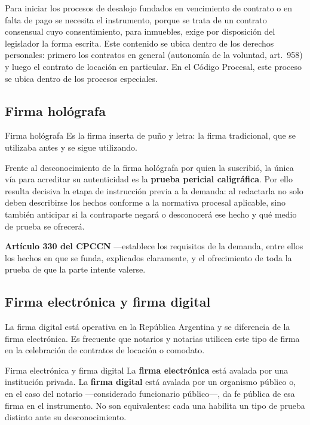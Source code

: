 \documentclass[12pt,oneside]{book}
\begin{document}
Para iniciar los procesos de desalojo fundados en vencimiento de contrato o en falta de pago se necesita el instrumento, porque se trata de un contrato consensual cuyo consentimiento, para inmuebles, exige por disposición del legislador la forma escrita. Este contenido se ubica dentro de los derechos personales: primero los contratos en general (autonomía de la voluntad, art.\ 958) y luego el contrato de locación en particular. En el Código Procesal, este proceso se ubica dentro de los procesos especiales.

\subsection{Firma hológrafa}

\begin{definition}{Firma hológrafa}
Es la firma inserta de puño y letra: la firma tradicional, que se utilizaba antes y se sigue utilizando.
\end{definition}

Frente al desconocimiento de la firma hológrafa por quien la suscribió, la única vía para acreditar su autenticidad es la \textbf{prueba pericial caligráfica}. Por ello resulta decisiva la etapa de instrucción previa a la demanda: al redactarla no solo deben describirse los hechos conforme a la normativa procesal aplicable, sino también anticipar si la contraparte negará o desconocerá ese hecho y qué medio de prueba se ofrecerá.

\begin{normacitada}
\textbf{Artículo 330 del CPCCN} ---establece los requisitos de la demanda, entre ellos los hechos en que se funda, explicados claramente, y el ofrecimiento de toda la prueba de que la parte intente valerse.
\end{normacitada}

\subsection{Firma electrónica y firma digital}

La firma digital está operativa en la República Argentina y se diferencia de la firma electrónica. Es frecuente que notarios y notarias utilicen este tipo de firma en la celebración de contratos de locación o comodato.

\begin{definition}{Firma electrónica y firma digital}
La \textbf{firma electrónica} está avalada por una institución privada. La \textbf{firma digital} está avalada por un organismo público o, en el caso del notario ---considerado funcionario público---, da fe pública de esa firma en el instrumento. No son equivalentes: cada una habilita un tipo de prueba distinto ante su desconocimiento.
\end{definition}
\end{document}
